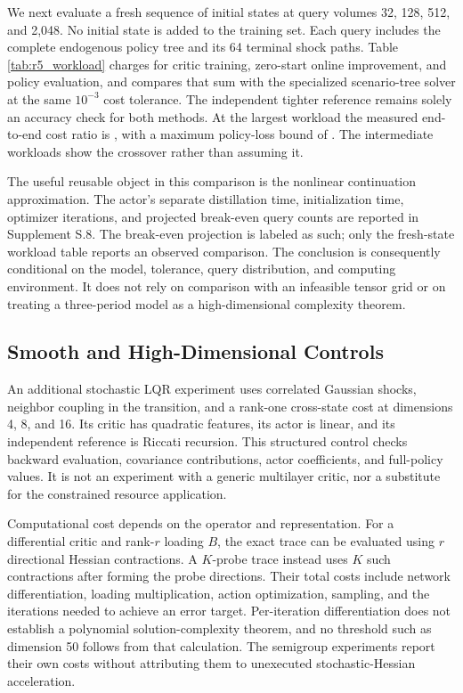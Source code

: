 We next evaluate a fresh sequence of initial states at query volumes 32, 128, 512, and 2,048. No initial state is added to the training set. Each query includes the complete endogenous policy tree and its 64 terminal shock paths. Table \ref{tab:r5_workload} charges for critic training, zero-start online improvement, and policy evaluation, and compares that sum with the specialized scenario-tree solver at the same $10^{-3}$ cost tolerance. The independent tighter reference remains solely an accuracy check for both methods. At the largest workload the measured end-to-end cost ratio is \NBOResourceBigRatio{}, with a maximum policy-loss bound of \NBOResourceBigLoss{}. The intermediate workloads show the crossover rather than assuming it.


The useful reusable object in this comparison is the nonlinear continuation approximation. The actor's separate distillation time, initialization time, optimizer iterations, and projected break-even query counts are reported in Supplement S.8. The break-even projection is labeled as such; only the fresh-state workload table reports an observed comparison. The conclusion is consequently conditional on the model, tolerance, query distribution, and computing environment. It does not rely on comparison with an infeasible tensor grid or on treating a three-period model as a high-dimensional complexity theorem.

\subsection{Smooth and High-Dimensional Controls}
An additional stochastic LQR experiment uses correlated Gaussian shocks, neighbor coupling in the transition, and a rank-one cross-state cost at dimensions 4, 8, and 16. Its critic has quadratic features, its actor is linear, and its independent reference is Riccati recursion. This structured control checks backward evaluation, covariance contributions, actor coefficients, and full-policy values. It is not an experiment with a generic multilayer critic, nor a substitute for the constrained resource application.

Computational cost depends on the operator and representation. For a differential critic and rank-$r$ loading $B$, the exact trace can be evaluated using $r$ directional Hessian contractions. A $K$-probe trace instead uses $K$ such contractions after forming the probe directions. Their total costs include network differentiation, loading multiplication, action optimization, sampling, and the iterations needed to achieve an error target. Per-iteration differentiation does not establish a polynomial solution-complexity theorem, and no threshold such as dimension 50 follows from that calculation. The semigroup experiments report their own costs without attributing them to unexecuted stochastic-Hessian acceleration.
